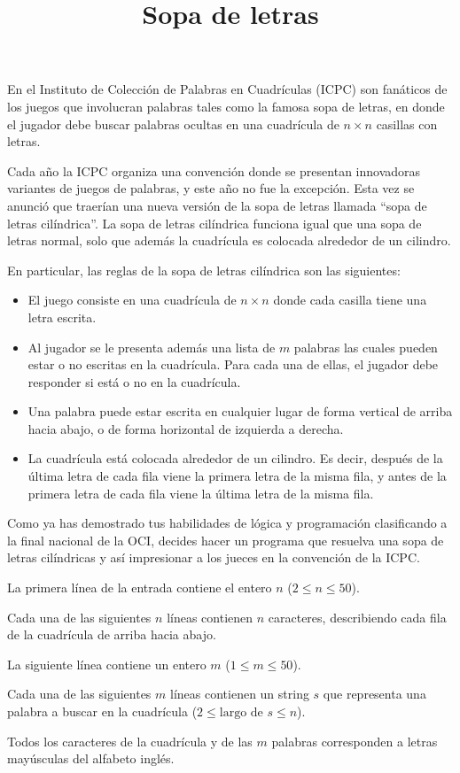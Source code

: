\documentclass{oci}
\title{Sopa de letras}
\begin{document}
\begin{problemDescription}
  En el Instituto de Colección de Palabras en Cuadrículas (ICPC) son fanáticos de los juegos que
  involucran palabras tales como la famosa sopa de letras, en donde el jugador debe buscar palabras
  ocultas en una cuadrícula de $n \times n$ casillas con letras.

  Cada año la ICPC organiza una convención donde se presentan innovadoras variantes de juegos de palabras,
  y este año no fue la excepción. Esta vez se anunció que traerían una nueva versión de 
  la sopa de letras llamada ``sopa de letras cilíndrica''. La sopa de letras cilíndrica funciona igual
  que una sopa de letras normal, solo que además la cuadrícula es colocada alrededor de un cilindro.

  En particular, las reglas de la sopa de letras cilíndrica son las siguientes:
  \begin{itemize}
    \item El juego consiste en una cuadrícula de $n \times n$ donde cada casilla tiene una letra
      escrita.
    \item Al jugador se le presenta además una lista de $m$ palabras las cuales pueden estar o no
      escritas en la cuadrícula. Para cada una de ellas, el jugador debe responder si está o no
      en la cuadrícula.
    \item Una palabra puede estar escrita en cualquier lugar de forma vertical de arriba hacia abajo, 
      o de forma horizontal de izquierda a derecha.
    \item La cuadrícula está colocada alrededor de un cilindro. Es decir, después de la última letra
      de cada fila viene la primera letra de la misma fila, y antes de la primera letra de cada fila
      viene la última letra de la misma fila.
  \end{itemize}

  Como ya has demostrado tus habilidades de lógica y programación clasificando a la final nacional de la OCI,
  decides hacer un programa que resuelva una sopa de letras cilíndricas y así impresionar a los jueces en la
  convención de la ICPC.
\end{problemDescription}

\begin{inputDescription}
  La primera línea de la entrada contiene el entero $n$ ($2 \leq n \leq 50$). 

  Cada una de las siguientes $n$ líneas contienen $n$ caracteres, describiendo
  cada fila de la cuadrícula de arriba hacia abajo.

  La siguiente línea contiene un entero $m$ ($1 \leq m \leq 50$).

  Cada una de las siguientes $m$ líneas contienen un string $s$ que representa
    una palabra a buscar en la cuadrícula ($2 \leq \text{largo de } s \leq n$).

  Todos los caracteres de la cuadrícula y de las $m$ palabras corresponden a letras mayúsculas
  del alfabeto inglés.
\end{inputDescription}
\end{document}
